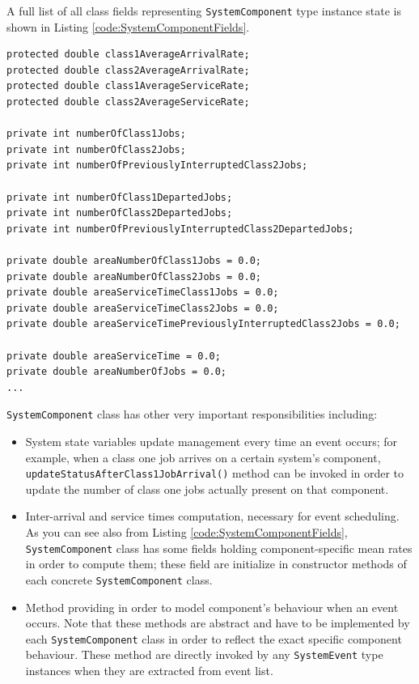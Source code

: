 \documentclass[10pt,a4paper]{article}
\begin{document}
A full list of all class fields representing \texttt{SystemComponent} type instance state is shown in Listing \ref{code:SystemComponentFields}.

\begin{lstlisting}[frame=lines, caption={Fields of \texttt{SystemComponent} abstract class.}, label={code:SystemComponentFields}]
protected double class1AverageArrivalRate;
protected double class2AverageArrivalRate;
protected double class1AverageServiceRate;
protected double class2AverageServiceRate;

private int numberOfClass1Jobs;
private int numberOfClass2Jobs;
private int numberOfPreviouslyInterruptedClass2Jobs;

private int numberOfClass1DepartedJobs;
private int numberOfClass2DepartedJobs;
private int numberOfPreviouslyInterruptedClass2DepartedJobs;

private double areaNumberOfClass1Jobs = 0.0;
private double areaNumberOfClass2Jobs = 0.0;
private double areaServiceTimeClass1Jobs = 0.0;
private double areaServiceTimeClass2Jobs = 0.0;
private double areaServiceTimePreviouslyInterruptedClass2Jobs = 0.0;

private double areaServiceTime = 0.0;
private double areaNumberOfJobs = 0.0;
...
\end{lstlisting}

\texttt{SystemComponent} class has other very important responsibilities including: 
  
\begin{itemize}

\item System state variables update management every time an event occurs; for example, when a class one job arrives on a certain system's component, \texttt{updateStatusAfterClass1JobArrival()} method can be invoked in order to update the number of class one jobs actually present on that component.

\item Inter-arrival and service times computation, necessary for event scheduling. As you can see also from Listing \ref{code:SystemComponentFields}, \texttt{SystemComponent} class has some fields holding component-specific mean rates in order to compute them; these field are initialize in constructor methods of each concrete \texttt{SystemComponent} class.

\item Method providing in order to model component's behaviour when an event occurs. Note that these methods are abstract and have to be implemented by each \texttt{SystemComponent} class in order to reflect the exact specific component behaviour. These method are directly invoked by any \texttt{SystemEvent} type instances when they are extracted from event list.
\end{itemize}
\end{document}
